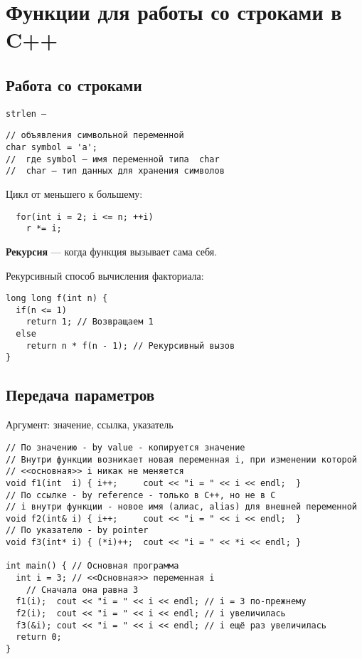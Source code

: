 \section{Функции для работы со строками в C++}

\subsection{Работа со строками}
\begin{frame}[t,fragile]{}

\tt{strlen} --- 

\begin{lstlisting}
// объявления символьной переменной
char symbol = 'a';
//  где symbol – имя переменной типа  char
//  char – тип данных для хранения символов
\end{lstlisting}

Цикл от меньшего к большему:
\begin{lstlisting}
  for(int i = 2; i <= n; ++i)
    r *= i;
\end{lstlisting}

\textbf{Рекурсия} --- когда функция вызывает сама себя.

Рекурсивный способ вычисления факториала:
\begin{lstlisting}
long long f(int n) {
  if(n <= 1)
    return 1; // Возвращаем 1
  else
    return n * f(n - 1); // Рекурсивный вызов
}
\end{lstlisting}

\end{frame}

\subsection{Передача параметров}

\begin{frame}[t,fragile]{Аргумент: значение, ссылка, указатель}
\begin{lstlisting}
// По значению - by value - копируется значение
// Внутри функции возникает новая переменная i, при изменении которой
// <<основная>> i никак не меняется
void f1(int  i) { i++;     cout << "i = " << i << endl;  }
// По ссылке - by reference - только в C++, но не в C
// i внутри функции - новое имя (алиас, alias) для внешней переменной
void f2(int& i) { i++;     cout << "i = " << i << endl;  }
// По указателю - by pointer
void f3(int* i) { (*i)++;  cout << "i = " << *i << endl; }

int main() { // Основная программа
  int i = 3; // <<Основная>> переменная i
    // Сначала она равна 3
  f1(i);  cout << "i = " << i << endl; // i = 3 по-прежнему
  f2(i);  cout << "i = " << i << endl; // i увеличилась
  f3(&i); cout << "i = " << i << endl; // i ещё раз увеличилась
  return 0;
}
\end{lstlisting}
\end{frame}

